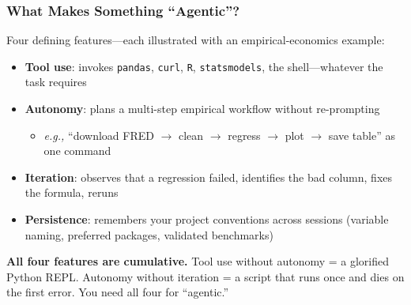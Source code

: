 \documentclass[10pt,english,aspectratio=169]{beamer}
\begin{document}
\begin{frame}
\frametitle{What Makes Something ``Agentic''?}

Four defining features---each illustrated with an empirical-economics example:

\vspace{0.3cm}

\begin{itemize}
    \item \textbf{Tool use}: invokes \texttt{pandas}, \texttt{curl}, \texttt{R}, \texttt{statsmodels}, the shell---whatever the task requires
    \vspace{0.1cm}
    \item \textbf{Autonomy}: plans a multi-step empirical workflow without re-prompting
    \begin{itemize}
        \item \textit{e.g.,} ``download FRED $\to$ clean $\to$ regress $\to$ plot $\to$ save table'' as one command
    \end{itemize}
    \vspace{0.1cm}
    \item \textbf{Iteration}: observes that a regression failed, identifies the bad column, fixes the formula, reruns
    \vspace{0.1cm}
    \item \textbf{Persistence}: remembers your project conventions across sessions (variable naming, preferred packages, validated benchmarks)
\end{itemize}

\vspace{0.3cm}

\textbf{All four features are cumulative.} Tool use without autonomy = a glorified Python REPL. Autonomy without iteration = a script that runs once and dies on the first error. You need all four for ``agentic.''
\end{frame}
\end{document}
